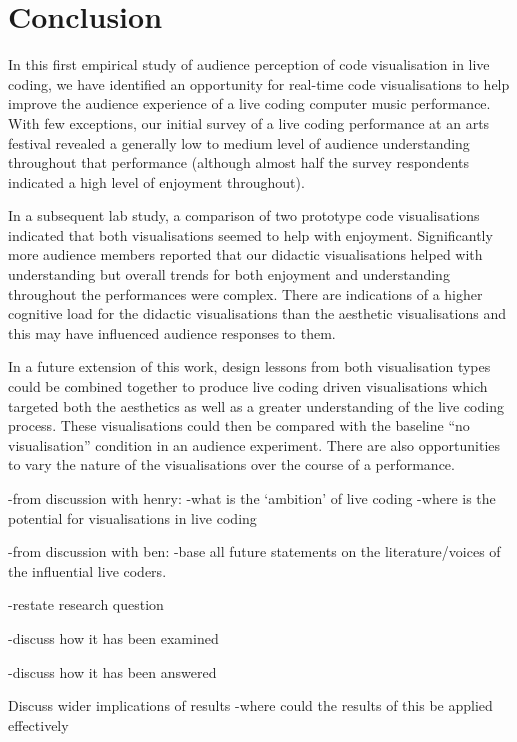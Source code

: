 
\chapter{Conclusion}
\label{chap:conclusion}


In this first empirical study of audience perception of code visualisation in live coding, we have identified an opportunity for real-time code visualisations to help improve the audience experience of a live coding computer music performance. With few exceptions, our initial survey of a live coding performance at an arts festival revealed a generally low to medium level of audience understanding throughout that performance (although almost half the survey respondents indicated a high level of enjoyment throughout).

In a subsequent lab study, a comparison of two prototype code visualisations indicated that both visualisations seemed to help with enjoyment. Significantly more audience members reported that our didactic visualisations helped with understanding but overall trends for both enjoyment and understanding throughout the performances were complex. There are indications of a higher cognitive load for the didactic visualisations than the aesthetic visualisations and this may have influenced audience responses to them.

In a future extension of this work, design lessons from both visualisation types could be combined together to produce live coding driven visualisations which targeted both the aesthetics as well as a greater understanding of the live coding process. These visualisations could then be compared with the baseline ``no visualisation'' condition in an audience experiment. There are also opportunities to vary the nature of the visualisations over the course of a performance.

-from discussion with henry:
	-what is the `ambition' of live coding
	-where is the potential for visualisations in live coding

-from discussion with ben:
	-base all future statements on the literature/voices of the influential live coders.

-restate research question

-discuss how it has been examined

-discuss how it has been answered

Discuss wider implications of results
-where could the results of this be applied effectively 

